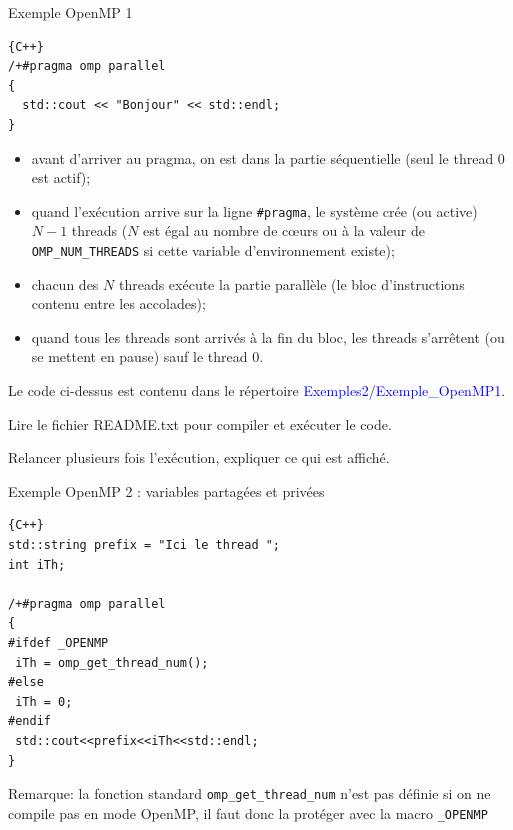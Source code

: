 \documentclass{beamer}
\begin{document}
\begin{frame}[fragile]
	
	Exemple OpenMP 1
	\begin{lstlisting}{C++}
/+#pragma omp parallel
{
  std::cout << "Bonjour" << std::endl;
}
\end{lstlisting}

\vfill
{\small
\begin{itemize}
	\item avant d'arriver au pragma, on est dans la partie séquentielle (seul le thread 0 est actif); 
	\item quand l'exécution arrive sur la ligne \verb|#pragma|, le système crée (ou active) $N-1$ threads ($N$ est égal au nombre de c\oe urs ou à la valeur de \verb|OMP_NUM_THREADS| si cette variable d'environnement existe);
	\item chacun des $N$ threads exécute la partie parallèle (le bloc d'instructions contenu entre les accolades);
	\item quand tous les threads sont arrivés à la fin du bloc, les threads s'arrêtent (ou se mettent en pause) sauf le thread 0.
\end{itemize}
}

\end{frame}

\begin{frame}
Le code ci-dessus est contenu dans le répertoire \textcolor{blue}{Exemples2/Exemple\_OpenMP1}.

Lire le fichier README.txt pour compiler et exécuter le code.

\bigskip
Relancer plusieurs fois l'exécution, expliquer ce qui est affiché.

\end{frame}

\begin{frame}[fragile]
	Exemple OpenMP 2 : variables partagées et privées
	\vfill
	

\begin{lstlisting}{C++}
std::string prefix = "Ici le thread ";
int iTh;

/+#pragma omp parallel
{
#ifdef _OPENMP
 iTh = omp_get_thread_num();
#else
 iTh = 0;
#endif
 std::cout<<prefix<<iTh<<std::endl;
}
\end{lstlisting}

\vfill
Remarque: la fonction standard \verb|omp_get_thread_num| n'est pas définie si on ne compile pas en mode OpenMP, il faut donc la protéger avec la macro \verb|_OPENMP|
\end{frame}
\end{document}
